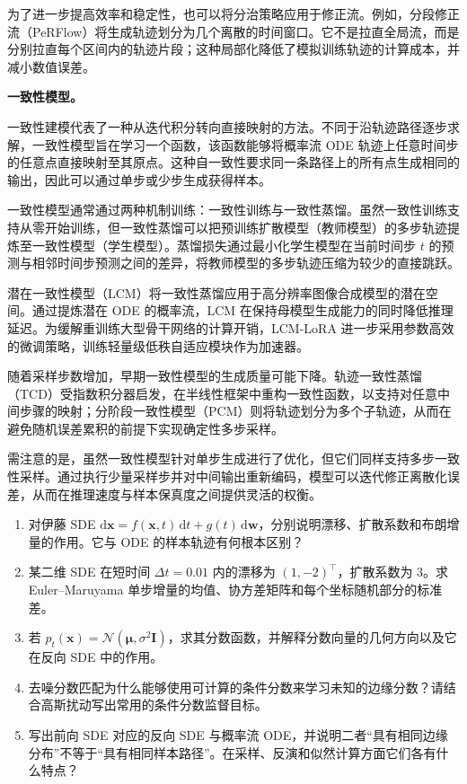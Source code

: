 为了进一步提高效率和稳定性，也可以将分治策略应用于修正流。例如，分段修正流（PeRFlow）将生成轨迹划分为几个离散的时间窗口。它不是拉直全局流，而是分别拉直每个区间内的轨迹片段；这种局部化降低了模拟训练轨迹的计算成本，并减小数值误差。

\textbf{一致性模型。}

一致性建模代表了一种从迭代积分转向直接映射的方法。不同于沿轨迹路径逐步求解，一致性模型旨在学习一个函数，该函数能够将概率流 ODE 轨迹上任意时间步的任意点直接映射至其原点。这种自一致性要求同一条路径上的所有点生成相同的输出，因此可以通过单步或少步生成获得样本。

一致性模型通常通过两种机制训练：一致性训练与一致性蒸馏。虽然一致性训练支持从零开始训练，但一致性蒸馏可以把预训练扩散模型（教师模型）的多步轨迹提炼至一致性模型（学生模型）。蒸馏损失通过最小化学生模型在当前时间步 $t$ 的预测与相邻时间步预测之间的差异，将教师模型的多步轨迹压缩为较少的直接跳跃。

潜在一致性模型（LCM）将一致性蒸馏应用于高分辨率图像合成模型的潜在空间。通过提炼潜在 ODE 的概率流，LCM 在保持母模型生成能力的同时降低推理延迟。为缓解重训练大型骨干网络的计算开销，LCM-LoRA 进一步采用参数高效的微调策略，训练轻量级低秩自适应模块作为加速器。

随着采样步数增加，早期一致性模型的生成质量可能下降。轨迹一致性蒸馏（TCD）受指数积分器启发，在半线性框架中重构一致性函数，以支持对任意中间步骤的映射；分阶段一致性模型（PCM）则将轨迹划分为多个子轨迹，从而在避免随机误差累积的前提下实现确定性多步采样。

需注意的是，虽然一致性模型针对单步生成进行了优化，但它们同样支持多步一致性采样。通过执行少量采样步并对中间输出重新编码，模型可以迭代修正离散化误差，从而在推理速度与样本保真度之间提供灵活的权衡。

\begin{exercisebox}
  \begin{enumerate}
    \item 对伊藤 SDE \(\mathrm d\boldsymbol x=f(\boldsymbol x,t)\,\mathrm dt+g(t)\,\mathrm d\boldsymbol w\)，分别说明漂移、扩散系数和布朗增量的作用。它与 ODE 的样本轨迹有何根本区别？
    \item 某二维 SDE 在短时间 \(\Delta t=0.01\) 内的漂移为 \((1,-2)^\top\)，扩散系数为 \(3\)。求 Euler--Maruyama 单步增量的均值、协方差矩阵和每个坐标随机部分的标准差。
    \item 若 \(p_t(\boldsymbol x)=\mathcal N(\boldsymbol\mu,\sigma^2\boldsymbol I)\)，求其分数函数，并解释分数向量的几何方向以及它在反向 SDE 中的作用。
    \item 去噪分数匹配为什么能够使用可计算的条件分数来学习未知的边缘分数？请结合高斯扰动写出常用的条件分数监督目标。
    \item 写出前向 SDE 对应的反向 SDE 与概率流 ODE，并说明二者“具有相同边缘分布”不等于“具有相同样本路径”。在采样、反演和似然计算方面它们各有什么特点？
  \end{enumerate}
\end{exercisebox}

